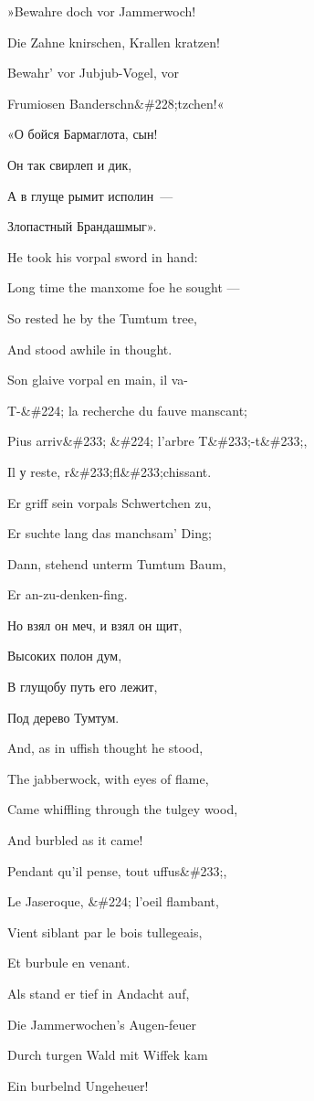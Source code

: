 \documentclass[../main.tex]{subfiles}
\begin{document}
»Bewahre doch vor Jammerwoch!

Die Zahne knirschen, Krallen kratzen!

Bewahr' vor Jubjub-Vogel, vor

Frumiosen Banderschn\&\#228;tzchen!«

«О бойся Бармаглота, сын!

Он так свирлеп и дик,

А в глуще рымит исполин~---

Злопастный Брандашмыг».

He took his vorpal sword in hand:

Long time the manxome foe he sought ---

So rested he by the Tumtum tree,

And stood awhile in thought.

Son glaive vorpal en main, il va-

T-\&\#224; la recherche du fauve manscant;

Pius arriv\&\#233; \&\#224; l'arbre T\&\#233;-t\&\#233;,

Il у reste, r\&\#233;fl\&\#233;chissant.

Er griff sein vorpals Schwertchen zu,

Er suchte lang das manchsam' Ding;

Dann, stehend unterm Tumtum Baum,

Er an-zu-denken-fing.

Но взял он меч, и взял он щит,

Высоких полон дум,

В глущобу путь его лежит,

Под дерево Тумтум.

And, as in uffish thought he stood,

The jabberwock, with eyes of flame,

Came whiffling through the tulgey wood,

And burbled as it came!

Pendant qu'il pense, tout uffus\&\#233;,

Le Jaseroque, \&\#224; l'oeil flambant,

Vient siblant par le bois tullegeais,

Et burbule en venant.

Als stand er tief in Andacht auf,

Die Jammerwochen's Augen-feuer

Durch turgen Wald mit Wiffek kam

Ein burbelnd Ungeheuer!
\end{document}
